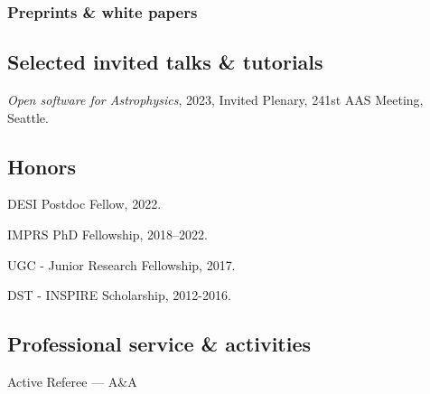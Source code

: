 \documentclass[12pt,letterpaper]{article}
\begin{document}
  \subsubsection{Preprints \& white papers}
  \begin{list}{}{\cvlist}
    
  \end{list}
\fi

\subsection{Selected invited talks \& tutorials}
\begin{list}{}{\cvlist}

  \item \emph{Open software for Astrophysics},
      2023, Invited Plenary, 241st AAS Meeting, Seattle.

\end{list}

\subsection{Honors}
\begin{list}{}{\cvlist}

  \item DESI Postdoc Fellow, 2022.
  \item IMPRS PhD Fellowship, 2018--2022.
  \item UGC - Junior Research Fellowship, 2017.
  \item DST - INSPIRE Scholarship, 2012-2016.

\end{list}


\subsection{Professional service \& activities}
\begin{list}{}{\cvlist}
  \item Active Referee ---
        A\&A
\end{list}
\end{document}
